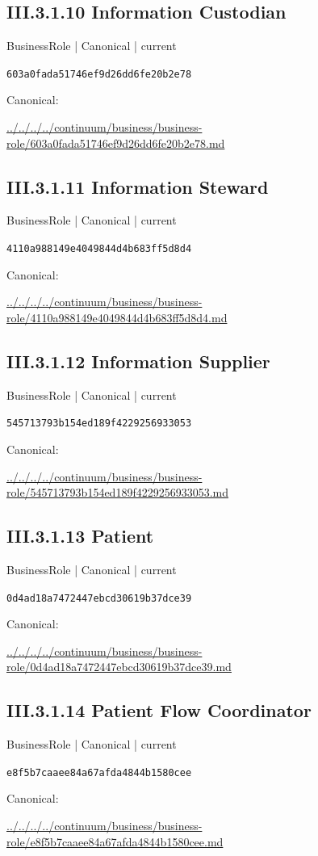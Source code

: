 \documentclass[10pt,a4paper]{article}
\begin{document}
\subsection*{III.3.1.10 Information Custodian}
\label{element-603a0fada51746ef9d26dd6fe20b2e78}
{\small BusinessRole | Canonical | current}\par
\texttt{603a0fada51746ef9d26dd6fe20b2e78}\par
Canonical: \par
{\footnotesize\url{../../../../continuum/business/business-role/603a0fada51746ef9d26dd6fe20b2e78.md}}\par
\subsection*{III.3.1.11 Information Steward}
\label{element-4110a988149e4049844d4b683ff5d8d4}
{\small BusinessRole | Canonical | current}\par
\texttt{4110a988149e4049844d4b683ff5d8d4}\par
Canonical: \par
{\footnotesize\url{../../../../continuum/business/business-role/4110a988149e4049844d4b683ff5d8d4.md}}\par
\subsection*{III.3.1.12 Information Supplier}
\label{element-545713793b154ed189f4229256933053}
{\small BusinessRole | Canonical | current}\par
\texttt{545713793b154ed189f4229256933053}\par
Canonical: \par
{\footnotesize\url{../../../../continuum/business/business-role/545713793b154ed189f4229256933053.md}}\par
\subsection*{III.3.1.13 Patient}
\label{element-0d4ad18a7472447ebcd30619b37dce39}
{\small BusinessRole | Canonical | current}\par
\texttt{0d4ad18a7472447ebcd30619b37dce39}\par
Canonical: \par
{\footnotesize\url{../../../../continuum/business/business-role/0d4ad18a7472447ebcd30619b37dce39.md}}\par
\subsection*{III.3.1.14 Patient Flow Coordinator}
\label{element-e8f5b7caaee84a67afda4844b1580cee}
{\small BusinessRole | Canonical | current}\par
\texttt{e8f5b7caaee84a67afda4844b1580cee}\par
Canonical: \par
{\footnotesize\url{../../../../continuum/business/business-role/e8f5b7caaee84a67afda4844b1580cee.md}}\par
\end{document}
